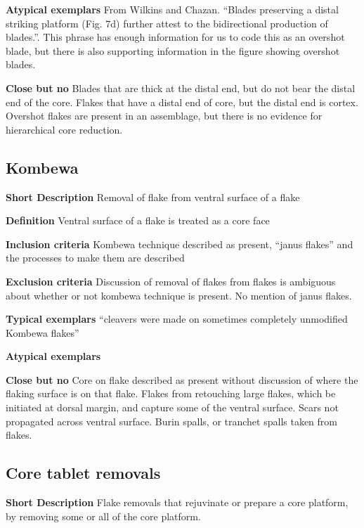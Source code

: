 \documentclass[
]{article}
\begin{document}
\textbf{Atypical exemplars} From Wilkins and Chazan. ``Blades preserving
a distal striking platform (Fig. 7d) further attest to the bidirectional
production of blades.''. This phrase has enough information for us to
code this as an overshot blade, but there is also supporting information
in the figure showing overshot blades.

\textbf{Close but no} Blades that are thick at the distal end, but do
not bear the distal end of the core. Flakes that have a distal end of
core, but the distal end is cortex. Overshot flakes are present in an
assemblage, but there is no evidence for hierarchical core reduction.

\hypertarget{kombewa}{%
\subsection{Kombewa}\label{kombewa}}

\textbf{Short Description} Removal of flake from ventral surface of a
flake

\textbf{Definition} Ventral surface of a flake is treated as a core face

\textbf{Inclusion criteria} Kombewa technique described as present,
``janus flakes'' and the processes to make them are described

\textbf{Exclusion criteria} Discussion of removal of flakes from flakes
is ambiguous about whether or not kombewa technique is present. No
mention of janus flakes.

\textbf{Typical exemplars} ``cleavers were made on sometimes completely
unmodified Kombewa flakes''

\textbf{Atypical exemplars}

\textbf{Close but no} Core on flake described as present without
discussion of where the flaking surface is on that flake. Flakes from
retouching large flakes, which be initiated at dorsal margin, and
capture some of the ventral surface. Scars not propagated across ventral
surface. Burin spalls, or tranchet spalls taken from flakes.

\hypertarget{core-tablet-removals}{%
\subsection{Core tablet removals}\label{core-tablet-removals}}

\textbf{Short Description} Flake removals that rejuvinate or prepare a
core platform, by removing some or all of the core platform.
\end{document}

